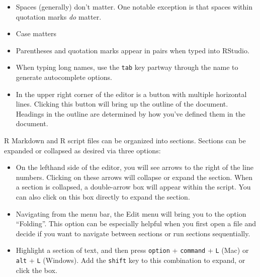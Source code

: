 \documentclass[
]{article}
\begin{document}
\begin{itemize}
\item
  Spaces (generally) don't matter. One notable exception is that spaces
  within quotation marks \emph{do} matter.
\item
  Case matters
\item
  Parentheses and quotation marks appear in pairs when typed into
  RStudio.
\item
  When typing long names, use the \texttt{tab} key partway through the
  name to generate autocomplete options.
\item
  In the upper right corner of the editor is a button with multiple
  horizontal lines. Clicking this button will bring up the outline of
  the document. Headings in the outline are determined by how you've
  defined them in the document.
\end{itemize}

R Markdown and R script files can be organized into sections. Sections
can be expanded or collapsed as desired via three options:

\begin{itemize}
\item
  On the lefthand side of the editor, you will see arrows to the right
  of the line numbers. Clicking on these arrows will collapse or expand
  the section. When a section is collapsed, a double-arrow box will
  appear within the script. You can also click on this box directly to
  expand the section.
\item
  Navigating from the menu bar, the Edit menu will bring you to the
  option ``Folding''. This option can be especially helpful when you
  first open a file and decide if you want to navigate between sections
  or run sections sequentially.
\item
  Highlight a section of text, and then press \texttt{option} +
  \texttt{command} + \texttt{L} (Mac) or \texttt{alt} + \texttt{L}
  (Windows). Add the \texttt{shift} key to this combination to expand,
  or click the box.
\end{itemize}
\end{document}
